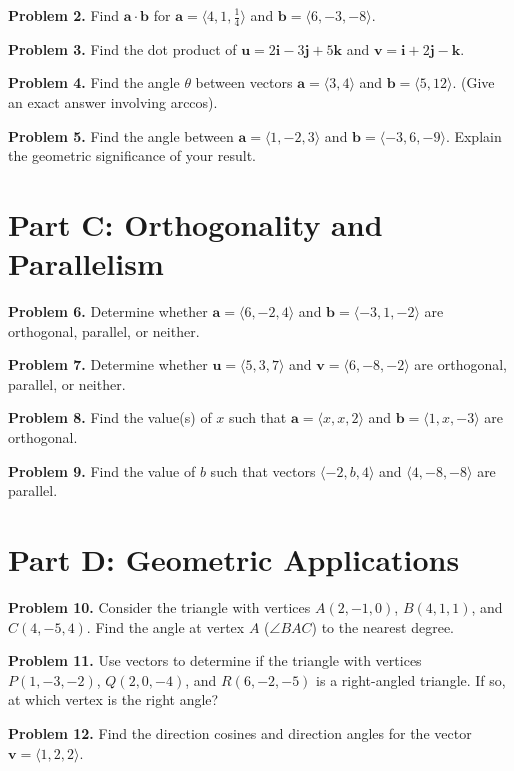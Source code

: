 \documentclass[12pt]{article}
\begin{document}
\textbf{Problem 2.} Find $\mathbf{a} \cdot \mathbf{b}$ for $\mathbf{a} = \langle 4, 1, \frac{1}{4} \rangle$ and $\mathbf{b} = \langle 6, -3, -8 \rangle$.

\textbf{Problem 3.} Find the dot product of $\mathbf{u} = 2\mathbf{i} - 3\mathbf{j} + 5\mathbf{k}$ and $\mathbf{v} = \mathbf{i} + 2\mathbf{j} - \mathbf{k}$.

\textbf{Problem 4.} Find the angle $\theta$ between vectors $\mathbf{a} = \langle 3, 4 \rangle$ and $\mathbf{b} = \langle 5, 12 \rangle$. (Give an exact answer involving arccos).

\textbf{Problem 5.} Find the angle between $\mathbf{a} = \langle 1, -2, 3 \rangle$ and $\mathbf{b} = \langle -3, 6, -9 \rangle$. Explain the geometric significance of your result.

\section*{Part C: Orthogonality and Parallelism}

\textbf{Problem 6.} Determine whether $\mathbf{a} = \langle 6, -2, 4 \rangle$ and $\mathbf{b} = \langle -3, 1, -2 \rangle$ are orthogonal, parallel, or neither.

\textbf{Problem 7.} Determine whether $\mathbf{u} = \langle 5, 3, 7 \rangle$ and $\mathbf{v} = \langle 6, -8, -2 \rangle$ are orthogonal, parallel, or neither.

\textbf{Problem 8.} Find the value(s) of $x$ such that $\mathbf{a} = \langle x, x, 2 \rangle$ and $\mathbf{b} = \langle 1, x, -3 \rangle$ are orthogonal.

\textbf{Problem 9.} Find the value of $b$ such that vectors $\langle -2, b, 4 \rangle$ and $\langle 4, -8, -8 \rangle$ are parallel.

\section*{Part D: Geometric Applications}

\textbf{Problem 10.} Consider the triangle with vertices $A(2, -1, 0)$, $B(4, 1, 1)$, and $C(4, -5, 4)$. Find the angle at vertex $A$ ($\angle BAC$) to the nearest degree.

\textbf{Problem 11.} Use vectors to determine if the triangle with vertices $P(1, -3, -2)$, $Q(2, 0, -4)$, and $R(6, -2, -5)$ is a right-angled triangle. If so, at which vertex is the right angle?

\textbf{Problem 12.} Find the direction cosines and direction angles for the vector $\mathbf{v} = \langle 1, 2, 2 \rangle$.
\end{document}
